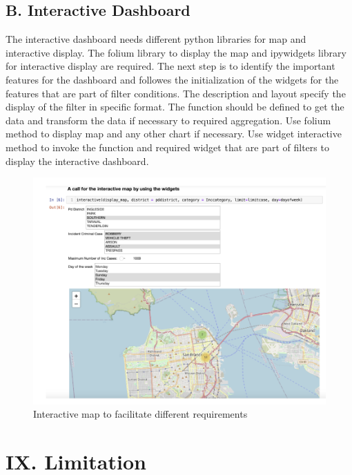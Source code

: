 \documentclass[10 pt,conference,final,]{IEEEtran}
\begin{document}
\subsection{B. Interactive Dashboard}\label{b.-interactive-dashboard}

The interactive dashboard needs different python libraries for map and
interactive display. The folium library to display the map and
ipywidgets library for interactive display are required. The next step
is to identify the important features for the dashboard and followes the
initialization of the widgets for the features that are part of filter
conditions. The description and layout specify the display of the filter
in specific format. The function should be defined to get the data and
transform the data if necessary to required aggregation. Use folium
method to display map and any other chart if necessary. Use widget
interactive method to invoke the function and required widget that are
part of filters to display the interactive dashboard.

\begin{figure}

{\centering \includegraphics[width=0.95\linewidth]{img/fig14b} 

}

\caption{Interactive map to facilitate different requirements}\label{fig:unnamed-chunk-19}
\end{figure}

\section{IX. Limitation}\label{ix.-limitation}
\end{document}
